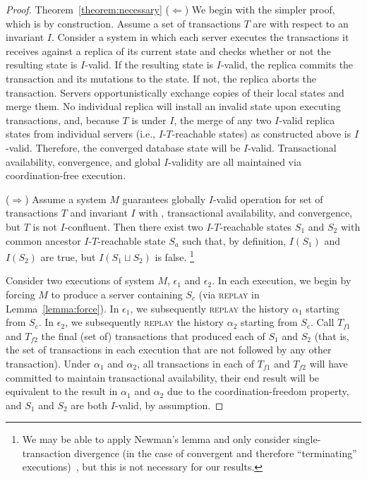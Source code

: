 \begin{proof}{Theorem~\ref{theorem:necessary}}
($\Leftarrow$) We begin with the simpler proof, which is by
  construction. Assume a set of transactions $T$ are \iconfluent with
  respect to an invariant $I$. Consider a system in which each server
  executes the transactions it receives against a replica of its current state and checks whether or not the resulting state is $I$-valid. If
  the resulting state is $I$-valid, the replica commits the
  transaction and its mutations to the state. If not, the replica
  aborts the transaction. Servers opportunistically exchange copies of
  their local states and merge them. No individual replica will
  install an invalid state upon executing transactions, and, because
  $T$ is \iconfluent under $I$, the merge of any two $I$-valid replica
  states from individual servers (i.e., $I$-$T$-reachable states) as
  constructed above is $I$-valid. Therefore, the converged database
  state will be $I$-valid. Transactional availability, convergence,
  and global $I$-validity are all maintained via coordination-free
  execution.

($\Rightarrow$) Assume a system $M$ guarantees globally $I$-valid
  operation for set of transactions $T$ and invariant $I$ with
  \cfreedom, transactional availability, and convergence, but $T$ is
  not $I$-confluent. Then there exist two $I$-$T$-reachable states $S_1$ and $S_2$ with common ancestor $I$-$T$-reachable state $S_a$ such that, by definition, $I(S_1)$ and $I(S_2)$ are true, but $I(S_1 \sqcup S_2)$ is false. \footnote{We may be able to apply Newman's
  lemma and only consider single-transaction divergence (in the case 
  of convergent and therefore ``terminating'' 
  executions)~\cite{obs-confluence,termrewriting}, but this is not 
  necessary for our results.\label{fn:newman-note}}

Consider two executions of system $M$, $\epsilon_1$ and $\epsilon_2$. In each execution, we begin by forcing $M$ to produce a server containing $S_c$ (via \textsc{replay} in Lemma~\ref{lemma:force}). In $\epsilon_1$, we subsequently \textsc{replay} the history $\alpha_1$ starting from $S_c$. In $\epsilon_2$, we subsequently \textsc{replay} the history $\alpha_2$ starting from $S_c$. Call $T_{f1}$ and $T_{f2}$ the final (set of) transactions that produced each of $S_1$ and $S_2$ (that is, the set of transactions in each execution that are not followed by any other transaction). Under $\alpha_1$ and $\alpha_2$, all transactions in each of $T_{f1}$ and $T_{f2}$ will have committed to maintain transactional availability, their end result will be equivalent to the result in $\alpha_1$ and $\alpha_2$ due to the coordination-freedom property, and $S_1$ and $S_2$ are both $I$-valid, by assumption.


\end{proof}

